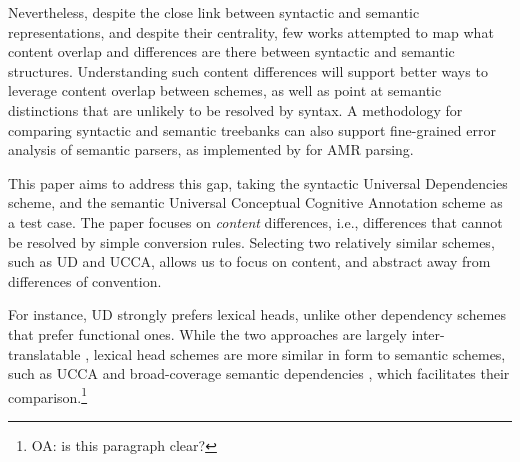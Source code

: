 \documentclass[11pt,a4paper]{article}
\newcommand{\oa}[1]{\footnote{\color{red}OA: #1}}
\begin{document}
  Nevertheless, despite the close link between syntactic and semantic representations,
  and despite their centrality, few works attempted to map what content overlap and differences
  are there between syntactic and semantic structures.
   Understanding such content differences will support better ways to leverage content overlap
   between schemes, as well as point at semantic distinctions that are unlikely to be resolved by syntax.
   A methodology for comparing syntactic and semantic treebanks can also support fine-grained error analysis 
   of semantic parsers, as implemented by \citet{szubert2018structured} for AMR parsing.
   
   This paper aims to address this gap, taking the syntactic Universal Dependencies scheme,
  and the semantic Universal Conceptual Cognitive Annotation \cite[UCCA; ][]{abend2013universal} scheme
  as a test case. 
  The paper focuses on {\it content} differences, i.e., differences that cannot be resolved by simple
  conversion rules. Selecting two relatively similar schemes, such as UD and UCCA, allows
  us to focus on content, and abstract away from differences of convention.
  
  For instance, UD strongly prefers lexical heads,
   unlike other dependency schemes that prefer functional ones.
  While the two approaches are largely inter-translatable
   \cite{Schwartz:12}, lexical head schemes are more similar in form to semantic schemes,
   such as UCCA and broad-coverage semantic dependencies \cite{oepen2015semeval},
   which facilitates their comparison.\oa{is this paragraph clear?}


  
\end{document}

